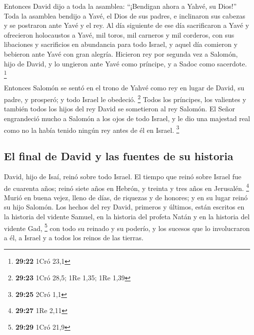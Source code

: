  Entonces David dijo a toda la asamblea: ``¡Bendigan
ahora a Yahvé, su Dios!'' Toda la asamblea bendijo a Yavé, el Dios de
sus padres, e inclinaron sus cabezas y se postraron ante Yavé y el rey.
 Al día siguiente de ese día sacrificaron a Yavé y
ofrecieron holocaustos a Yavé, mil toros, mil carneros y mil corderos,
con sus libaciones y sacrificios en abundancia para todo Israel,
 y aquel día comieron y bebieron ante Yavé con gran
alegría. Hicieron rey por segunda vez a Salomón, hijo de David, y lo
ungieron ante Yavé como príncipe, y a Sadoc como sacerdote. \footnote{\textbf{29:22}
  1Cró 23,1}

 Entonces Salomón se sentó en el trono de Yahvé como rey
en lugar de David, su padre, y prosperó; y todo Israel le obedeció.
\footnote{\textbf{29:23} 1Cró 28,5; 1Re 1,35; 1Re 1,39} 
Todos los príncipes, los valientes y también todos los hijos del rey
David se sometieron al rey Salomón.  El Señor engrandeció
mucho a Salomón a los ojos de todo Israel, y le dio una majestad real
como no la había tenido ningún rey antes de él en Israel. \footnote{\textbf{29:25}
  2Cró 1,1}

\hypertarget{el-final-de-david-y-las-fuentes-de-su-historia}{%
\subsection{El final de David y las fuentes de su
historia}\label{el-final-de-david-y-las-fuentes-de-su-historia}}

 David, hijo de Isaí, reinó sobre todo Israel.
 El tiempo que reinó sobre Israel fue de cuarenta años;
reinó siete años en Hebrón, y treinta y tres años en Jerusalén.
\footnote{\textbf{29:27} 1Re 2,11}  Murió en buena vejez,
lleno de días, de riquezas y de honores; y en su lugar reinó su hijo
Salomón.  Los hechos del rey David, primeros y últimos,
están escritos en la historia del vidente Samuel, en la historia del
profeta Natán y en la historia del vidente Gad, \footnote{\textbf{29:29}
  1Cró 21,9}  con todo su reinado y su poderío, y los
sucesos que lo involucraron a él, a Israel y a todos los reinos de las
tierras.
